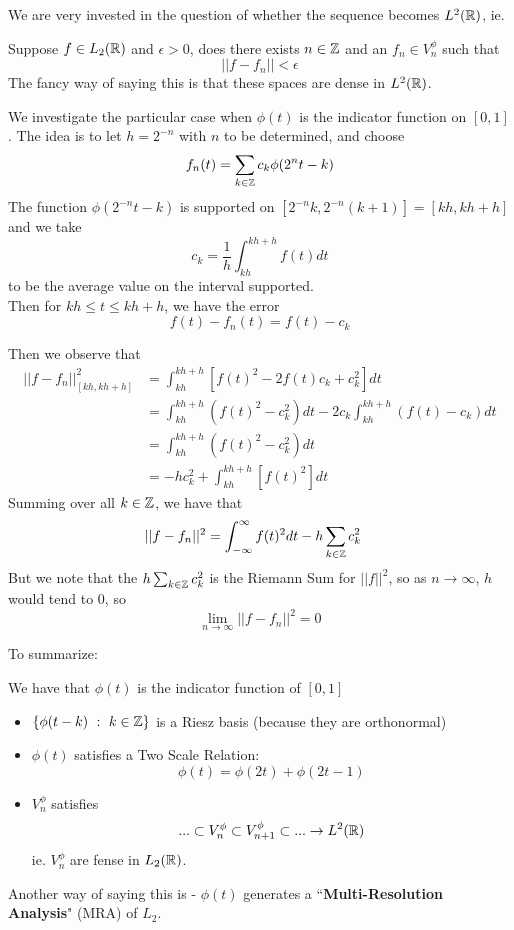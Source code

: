 \documentclass{article}
\begin{document}
We are very invested in the question of whether the sequence becomes $L^2(\mathbb{R})$, ie.
\begin{question}
    Suppose $f \in L_2(\mathbb{R})$ and $\epsilon > 0$, does there exists $n \in \mathbb{Z}$ and an $f_n \in V_n^\phi$ such that
    \[||f - f_n|| < \epsilon\]
    The fancy way of saying this is that these spaces are dense in $L^2(\mathbb{R})$.
\end{question}

We investigate the particular case when $\phi(t)$ is the indicator function on $[0, 1]$. The idea is to let $h = 2^{-n}$ with $n$ to be determined, and choose
\[f_n(t) = \sum_{k \in \mathbb{Z}} c_{k} \phi(2^{n} t - k) \]
The function $\phi(2^{-n} t - k)$ is supported on $[2^{-n} k, 2^{-n} (k + 1)] = [kh, kh + h]$ and we take
\[c_k = \frac{1}{h} \int_{kh}^{kh + h} f(t) dt\]
to be the average value on the interval supported.\\

Then for $kh \leq t \leq kh + h$, we have the error
\[f(t) - f_n(t) = f(t) - c_k\]

Then we observe that
\begin{align*}
    ||f - f_n||_{[kh, kh + h]}^2 &= \int_{kh}^{kh + h} [f(t)^2 - 2 f(t) c_k + c_k^2] dt\\
    &= \int_{kh}^{kh + h} (f(t)^2 - c_k^2) dt - 2 c_{k} \int_{kh}^{kh + h} (f(t) - c_k) dt\\
    &= \int_{kh}^{kh + h} (f(t)^2 - c_k^2) dt \tag*{By definition of $c_k$}\\
    &= - h c_k^2 + \int_{kh}^{kh + h} [f(t)^2] dt
\end{align*}
Summing over all $k \in \mathbb{Z}$, we have that
\begin{align*}
    ||f - f_n||^2 &= \int_{-\infty}^\infty f(t)^2 dt - h \sum_{k \in \mathbb{Z}} c_k^2
\end{align*}
But we note that the $ h \sum_{k \in \mathbb{Z}} c_k^2$ is the Riemann Sum for $||f||^2$, so as $n \to \infty$, $h$ would tend to $0$, so
\[\lim_{n \to \infty} ||f - f_n||^2 = 0\]

To summarize:
\begin{proposition}
We have that $\phi(t)$ is the indicator function of $[0, 1]$
   \begin{itemize}
    \item $\{\phi(t - k)\ :\ k \in \mathbb{Z}\}$ is a Riesz basis (because they are orthonormal)
    \item $\phi(t)$ satisfies a Two Scale Relation:
    \[\phi(t) = \phi(2t) + \phi(2t - 1)\]
    \item $V_n^\phi$ satisfies
    \[... \subset V_{n}^\phi \subset V_{n+1}^\phi \subset ... \to L^2(\mathbb{R})\]
    ie. $V_n^\phi$ are fense in $L_2(\mathbb{R})$.
\end{itemize} 
Another way of saying this is - $\phi(t)$ generates a ``\textbf{Multi-Resolution Analysis}" (MRA) of $L_2$.
\end{proposition}
\end{document}
